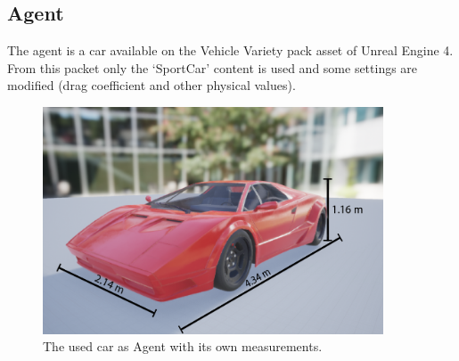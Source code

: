 \documentclass[14pt]{extarticle}
\def\sp{\vspace{5pt}}
\begin{document}
\begin{flushleft}
	\subsection{Agent}
	\sp
	The agent is a car available on the Vehicle Variety pack \cite{VVp} asset of Unreal Engine 4. From this packet only the `SportCar' content is used and some settings are modified (drag coefficient and other physical values).
	\begin{figure}[H]
    		\centering\includegraphics[width=0.9\textwidth]{./Image/Agent/car.png}
		\vspace{2mm}
    		\caption{The used car as Agent with its own measurements.}
	\end{figure}
	

\end{flushleft}
\end{document}
